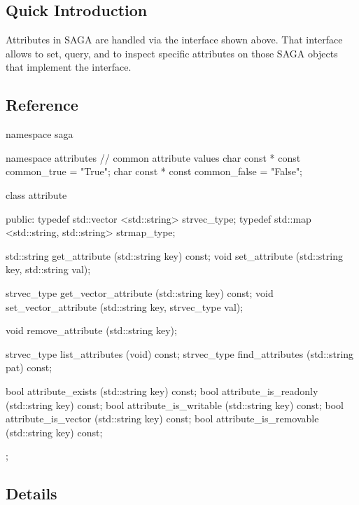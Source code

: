 
\subsection{Quick Introduction}

 Attributes in SAGA are handled via the  interface
 shown above.  That interface allows to set, query, and to inspect
 specific attributes on those SAGA objects that implement the
 interface.  
 

\subsection{Reference}

 \begin{mycode}[label=Prototype: saga::attribute]
  namespace saga
  {
    namespace attributes
    {
      // common attribute values
      char const * const common_true  = "True";
      char const * const common_false = "False";
    }
    
    class attribute 
    {
      public:
        typedef std::vector <std::string>              strvec_type;
        typedef std::map    <std::string, std::string> strmap_type;
  
        std::string  get_attribute          (std::string key)  const;
        void         set_attribute          (std::string key, 
                                             std::string val);

        strvec_type  get_vector_attribute   (std::string key)  const;
        void         set_vector_attribute   (std::string key, 
                                             strvec_type val);

        void         remove_attribute       (std::string key);

        strvec_type  list_attributes        (void) const;
        strvec_type  find_attributes        (std::string pat)  const;

        bool         attribute_exists       (std::string key)  const;
        bool         attribute_is_readonly  (std::string key)  const;
        bool         attribute_is_writable  (std::string key)  const;
        bool         attribute_is_vector    (std::string key)  const;
        bool         attribute_is_removable (std::string key)  const;
    };
  }
 \end{mycode}


\subsection{Details}


